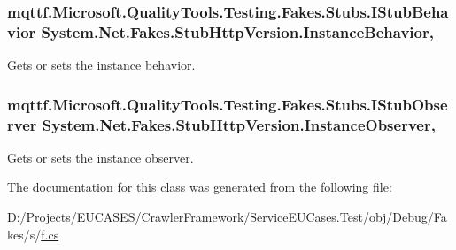 \hypertarget{class_system_1_1_net_1_1_fakes_1_1_stub_http_version_ae458623cbacd48bdeac27b513ebfb837}{
\subsubsection[{Instance\-Behavior}]{\setlength{\rightskip}{0pt plus 5cm}mqttf.\-Microsoft.\-Quality\-Tools.\-Testing.\-Fakes.\-Stubs.\-I\-Stub\-Behavior System.\-Net.\-Fakes.\-Stub\-Http\-Version.\-Instance\-Behavior\hspace{0.3cm}{\ttfamily [get]}, {\ttfamily [set]}}}\label{class_system_1_1_net_1_1_fakes_1_1_stub_http_version_ae458623cbacd48bdeac27b513ebfb837}


Gets or sets the instance behavior.

\hypertarget{class_system_1_1_net_1_1_fakes_1_1_stub_http_version_a5616af2bd40ac609e6adf3a70525bf29}{
\subsubsection[{Instance\-Observer}]{\setlength{\rightskip}{0pt plus 5cm}mqttf.\-Microsoft.\-Quality\-Tools.\-Testing.\-Fakes.\-Stubs.\-I\-Stub\-Observer System.\-Net.\-Fakes.\-Stub\-Http\-Version.\-Instance\-Observer\hspace{0.3cm}{\ttfamily [get]}, {\ttfamily [set]}}}\label{class_system_1_1_net_1_1_fakes_1_1_stub_http_version_a5616af2bd40ac609e6adf3a70525bf29}


Gets or sets the instance observer.



The documentation for this class was generated from the following file\-:\begin{DoxyCompactItemize}
\item 
D\-:/\-Projects/\-E\-U\-C\-A\-S\-E\-S/\-Crawler\-Framework/\-Service\-E\-U\-Cases.\-Test/obj/\-Debug/\-Fakes/s/\hyperlink{s_2f_8cs}{f.\-cs}\end{DoxyCompactItemize}
